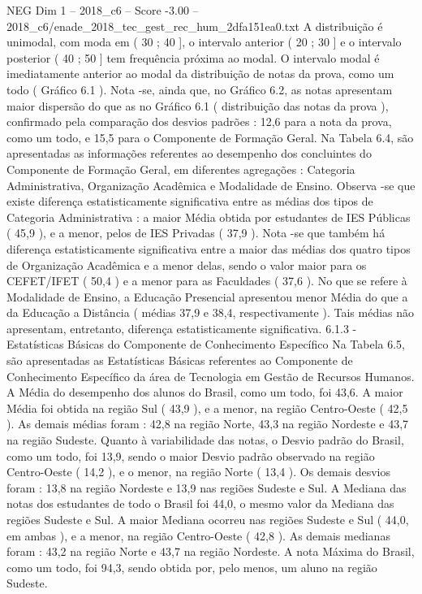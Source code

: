 \begin{textsample}{NEG Dim 1 – 2018\_c6 – Score -3.00 – 2018\_c6/enade\_2018\_tec\_gest\_rec\_hum\_2dfa151ea0.txt}
A distribuição é unimodal, com moda em ( 30 ; 40 ], o intervalo anterior ( 20 ; 30 ] e o intervalo posterior ( 40 ; 50 ] tem frequência próxima ao modal.
O intervalo modal é imediatamente anterior ao modal da distribuição de notas da prova, como um todo ( Gráfico 6.1 ).
Nota -se, ainda que, no Gráfico 6.2, as notas apresentam maior dispersão do que as no Gráfico 6.1 ( distribuição das notas da prova ), confirmado pela comparação dos desvios padrões : 12,6 para a nota da prova, como um todo, e 15,5 para o Componente de Formação Geral.
Na Tabela 6.4, são apresentadas as informações referentes ao desempenho dos concluintes do Componente de Formação Geral, em diferentes agregações : Categoria Administrativa, Organização Acadêmica e Modalidade de Ensino.
Observa -se que existe diferença estatisticamente significativa entre as médias dos tipos de Categoria Administrativa : a maior Média obtida por estudantes de IES Públicas ( 45,9 ), e a menor, pelos de IES Privadas ( 37,9 ).
Nota -se que também há diferença estatisticamente significativa entre a maior das médias dos quatro tipos de Organização Acadêmica e a menor delas, sendo o valor maior para os CEFET/IFET ( 50,4 ) e a menor para as Faculdades ( 37,6 ).
No que se refere à Modalidade de Ensino, a Educação Presencial apresentou menor Média do que a da Educação a Distância ( médias 37,9 e 38,4, respectivamente ).
Tais médias não apresentam, entretanto, diferença estatisticamente significativa. 6.1.3 - Estatísticas Básicas do Componente de Conhecimento Específico Na Tabela 6.5, são apresentadas as Estatísticas Básicas referentes ao Componente de Conhecimento Específico da área de Tecnologia em Gestão de Recursos Humanos.
A Média do desempenho dos alunos do Brasil, como um todo, foi 43,6.
A maior Média foi obtida na região Sul ( 43,9 ), e a menor, na região Centro-Oeste ( 42,5 ).
As demais médias foram : 42,8 na região Norte, 43,3 na região Nordeste e 43,7 na região Sudeste.
Quanto à variabilidade das notas, o Desvio padrão do Brasil, como um todo, foi 13,9, sendo o maior Desvio padrão observado na região Centro-Oeste ( 14,2 ), e o menor, na região Norte ( 13,4 ).
Os demais desvios foram : 13,8 na região Nordeste e 13,9 nas regiões Sudeste e Sul.
A Mediana das notas dos estudantes de todo o Brasil foi 44,0, o mesmo valor da Mediana das regiões Sudeste e Sul.
A maior Mediana ocorreu nas regiões Sudeste e Sul ( 44,0, em ambas ), e a menor, na região Centro-Oeste ( 42,8 ).
As demais medianas foram : 43,2 na região Norte e 43,7 na região Nordeste.
A nota Máxima do Brasil, como um todo, foi 94,3, sendo obtida por, pelo menos, um aluno na região Sudeste.

\end{textsample}
